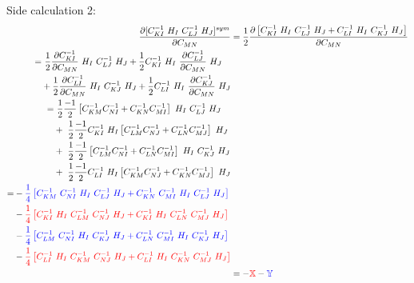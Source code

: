 Side calculation 2:
\begin{align*}
\dfrac{\partial [C^{-1}_{KI} \ H_I \ C^{-1}_{LJ} \ H_J]^{sym}}{\partial C_{MN}} &= \dfrac{1}{2} \dfrac{\partial \left[ C^{-1}_{KI} \ H_I \ C^{-1}_{LJ} \ H_J + C^{-1}_{LI} \ H_I \ C^{-1}_{KJ} \ H_J \right] }{\partial C_{MN}}\\
\begin{split}
= & \ \dfrac{1}{2} \dfrac{\partial C^{-1}_{KI}}{\partial C_{MN}} \ H_I \ C^{-1}_{LJ} \ H_J + \dfrac{1}{2} C^{-1}_{KI} \ H_I \ \dfrac{\partial C^{-1}_{LJ}}{\partial C_{MN}} \ H_J \\
&+ \dfrac{1}{2} \dfrac{\partial C^{-1}_{LI}}{\partial C_{MN}} \ H_I \ C^{-1}_{KJ} \ H_J + \dfrac{1}{2} C^{-1}_{LI} \ H_I \ \dfrac{\partial C^{-1}_{KJ}}{\partial C_{MN}} \ H_J \\
\end{split}\\
\begin{split}
= & \ \dfrac{1}{2} \dfrac{-1}{2} \left[ C^{-1}_{KM} C^{-1}_{NI} + C^{-1}_{KN} C^{-1}_{MI} \right] \ H_I \ C^{-1}_{LJ} \ H_J \\
&+ \ \dfrac{1}{2} \dfrac{-1}{2} C^{-1}_{KI} \ H_I \left[ C^{-1}_{LM} C^{-1}_{NJ} + C^{-1}_{LN} C^{-1}_{MJ} \right] \ H_J \\
&+ \ \dfrac{1}{2} \dfrac{-1}{2} \left[ C^{-1}_{LM} C^{-1}_{NI} + C^{-1}_{LN} C^{-1}_{MI} \right] \ H_I \ C^{-1}_{KJ} \ H_J \\
&+ \ \dfrac{1}{2} \dfrac{-1}{2} C^{-1}_{LI} \ H_I \left[ C^{-1}_{KM} C^{-1}_{NJ} + C^{-1}_{KN} C^{-1}_{MJ} \right] \ H_J \\
\end{split}\\
\begin{split}
= &- \textcolor{blue}{\dfrac{1}{4} \left[ C^{-1}_{KM} \ C^{-1}_{NI} \ H_I \ C^{-1}_{LJ} \ H_J + C^{-1}_{KN} \ C^{-1}_{MI} \ H_I \ C^{-1}_{LJ} \ H_J \right]} \\
&- \textcolor{red}{\dfrac{1}{4} \left[ C^{-1}_{KI} \ H_I \ C^{-1}_{LM} \ C^{-1}_{NJ} \ H_J + C^{-1}_{KI} \ H_I \ C^{-1}_{LN} \ C^{-1}_{MJ} \ H_J \right]} \\
&- \textcolor{blue}{\dfrac{1}{4} \left[ C^{-1}_{LM} \ C^{-1}_{NI} \ H_I \ C^{-1}_{KJ} \ H_J + C^{-1}_{LN} \ C^{-1}_{MI} \ H_I \ C^{-1}_{KJ} \ H_J \right]} \\
&- \textcolor{red}{\dfrac{1}{4} \left[ C^{-1}_{LI} \ H_I \ C^{-1}_{KM} \ C^{-1}_{NJ} \ H_J + C^{-1}_{LI} \ H_I \ C^{-1}_{KN} \ C^{-1}_{MJ} \ H_J \right]}\\
\end{split}\\
&= -\textcolor{red}{\mathbb{X}} - \textcolor{blue}{\mathbb{Y}}
\end{align*}
